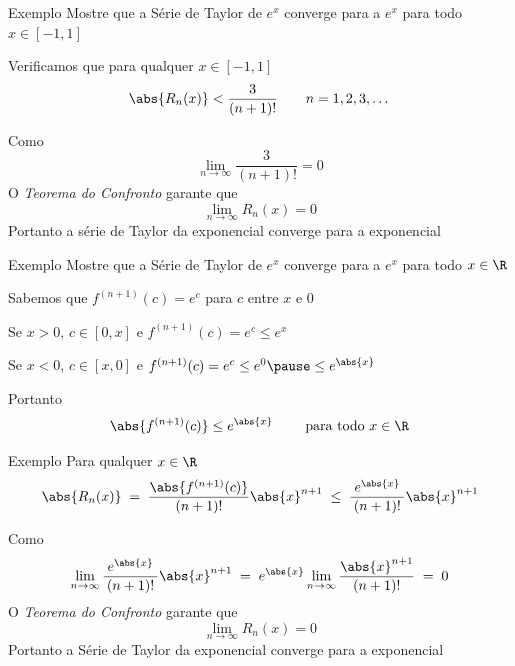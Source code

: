 \addtocounter{exemplo}{1}
\begin{frame}{Exemplo \theexemplo}
  Mostre que a Série de Taylor de \(e^x\) converge para a \(e^x\) para todo
  \(x\in[-1, 1]\)

  \pause
  \vspace{\baselineskip}
  Verificamos que para qualquer \(x\in[-1, 1]\)
  \[
    \abs{R_n(x)} < \frac{\;3\;}{(n+1)!}
    \qquad
    n = 1, 2, 3, \dots
  \]

  \pause
  Como
  \[
    \lim_{n\to\infty} \frac{\;3\;}{(n+1)!} = 0
  \]
  \pause
  O \emph{Teorema do Confronto} garante que
  \[
    \lim_{n\to\infty} R_n(x) = 0
  \]
  \pause
  Portanto a série de Taylor da exponencial converge para a exponencial
\end{frame}

\addtocounter{exemplo}{1}
\begin{frame}{Exemplo \theexemplo}
  Mostre que a Série de Taylor de \(e^x\) converge para a \(e^x\) para todo
  \(x\in\R\)

  \pause
  \vspace{\baselineskip}
  Sabemos que
  \(
    f^{(n+1)}(c) = e^c
  \)
  para \(c\) entre \(x\) e \(0\)

  \pause
  \vspace{\baselineskip}
  Se \(x>0\), \(c\in[0, x]\)
  \pause
  e \;
  \(
    f^{(n+1)}(c) = e^c \leq e^x
  \)

  \pause
  \vspace{0.5\baselineskip}
  Se \(x<0\), \(c\in[x, 0]\)
  \pause
  e \;
  \(
    f^{(n+1)}(c) = e^c \leq e^0
    \pause
    \leq e^{\abs{x}}
  \)

  \pause
  \vspace{0.5\baselineskip}
  Portanto
  \[
    \abs{f^{(n+1)}(c)} \leq e^{\abs{x}}
    \qquad
    \text{ para todo } x \in \R
  \]
\end{frame}

\begin{frame}{Exemplo \theexemplo}
  Para qualquer \(x\in\R\)
  \[
    \abs{R_n(x)}
    \;=\;    \frac{\abs{f^{(n+1)}(c)}}{(n+1)!}\abs{x}^{n+1}
    \;\leq\; \frac{\;e^{\abs{x}}\;}{(n+1)!}\abs{x}^{n+1}
  \]

  \pause
  Como
  \[
    \lim_{n\to\infty} \frac{\;e^{\abs{x}}\;}{(n+1)!}\abs{x}^{n+1}
    \;=\; e^{\abs{x}} \lim_{n\to\infty} \frac{\abs{x}^{n+1}}{(n+1)!}
    \;=\; 0
  \]
  \pause
  O \emph{Teorema do Confronto} garante que
  \[
    \lim_{n\to\infty} R_n(x) = 0
  \]
  \pause
  Portanto a Série de Taylor da exponencial converge para a exponencial
\end{frame}

